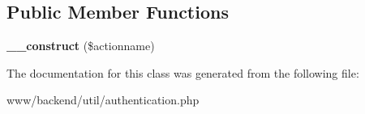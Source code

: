 \subsection*{Public Member Functions}
\begin{DoxyCompactItemize}
\item 
\hypertarget{classAccessDeniedException_a3a82de34e6a66f435b43fda664ccc89c}{
{\bfseries \_\-\_\-construct} (\$actionname)}
\label{classAccessDeniedException_a3a82de34e6a66f435b43fda664ccc89c}

\end{DoxyCompactItemize}


The documentation for this class was generated from the following file:\begin{DoxyCompactItemize}
\item 
www/backend/util/authentication.php\end{DoxyCompactItemize}

